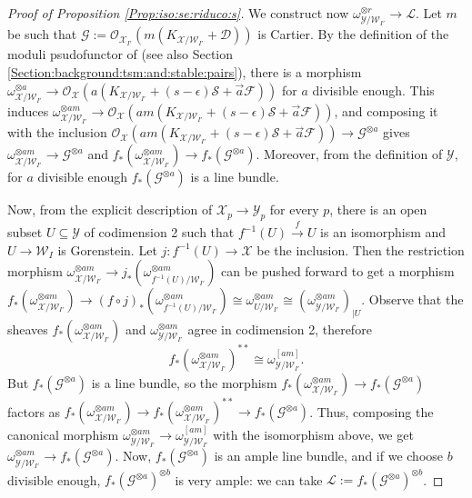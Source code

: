 \documentclass[11pt]{amsart}
\newcommand{\cE}{\mathcal{W}}
\newcommand{\sD}{\mathscr{D}}
\newcommand{\sF}{\mathscr{F}}
\newcommand{\sG}{\mathscr{G}}
\newcommand{\sL}{\mathscr{L}}
\newcommand{\sS}{\mathscr{S}}
\newcommand{\sX}{\mathscr{X}}
\newcommand{\cO}{\mathcal{O}}
\newcommand{\sY}{\mathscr{Y}}
\theoremstyle{definition}
\begin{document}
\begin{proof}[Proof of Proposition \ref{Prop:iso:se:riduco:s}]
 We construct now $\omega_{\sY/\cE_{I'}}^{\otimes r} \to \sL$. Let $m$ be such that $\sG:=\cO_{\sX_{I'}}(m(K_{\sX/\cE_{I'}}+\sD))$ is Cartier. By the definition of the moduli psudofunctor of
 \cite{KP} (see also Section \ref{Section:background:tsm:and:stable:pairs}), there is a morphism
 $\omega_{\sX/\cE_{I'}}^{\otimes a} \to \cO_{\sX}(a(K_{\sX/\cE_{I'}}+(s-\epsilon)\sS+\vec{a}\sF))$ for $a$ divisible enough. This induces $\omega_{\sX/\cE_{I'}}^{\otimes am} \to \cO_{\sX}(am(K_{\sX/\cE_{I'}}+(s-\epsilon)\sS+\vec{a}\sF))$, and composing it with the inclusion $\cO_{\sX}(am(K_{\sX/\cE_{I'}}+(s-\epsilon)\sS+\vec{a}\sF)) \to \sG^{\otimes a}$ gives $\omega_{\sX/\cE_{I'}}^{\otimes am}\to \sG^{\otimes a}$ and
 $f_*(\omega_{\sX/\cE_{I'}}^{\otimes am})\to f_*(\sG^{\otimes a})$. Moreover, from the definition of $\sY$, for $a$ divisible enough $f_*(\sG^{\otimes a})$ is a line bundle.
 
  Now, from the explicit description of $\sX_p
 \to \sY_p$ for every $p$, there is an open subset $U \subseteq \sY$ of codimension 2 such that $f^{-1}(U) \xrightarrow{f} U$ is an isomorphism and $U \to \cE_I$ is Gorenstein. Let $j:f^{-1}(U) \to \sX$ be the inclusion. Then the restriction morphism $\omega_{\sX/\cE_{I'}}^{\otimes am} \to j_*(\omega_{f^{-1}(U)/\cE_{I'}}^{\otimes am})$ can be pushed forward to get a morphism $f_*(\omega_{\sX/\cE_{I'}}^{\otimes am}) \to (f\circ j)_*(\omega_{f^{-1}(U)/\cE_{I'}}^{\otimes am}) \cong \omega_{U/\cE_{I'}}^{\otimes am} \cong (\omega_{\sY/\cE_{I'}}^{\otimes am})_{|U}$. Observe that the sheaves $f_*(\omega_{\sX/\cE_{I'}}^{\otimes am})$ and $\omega_{\sY/\cE_{I'}}^{\otimes am}$ agree in codimension 2, therefore
$$f_*(\omega_{\sX/\cE_{I'}}^{\otimes am})^{**} \cong \omega_{\sY/\cE_{I'}}^{[am]}.$$But $f_*(\sG^{\otimes a})$ is a line bundle, so the morphism $f_*(\omega_{\sX/\cE_{I'}}^{\otimes am})\to f_*(\sG^{\otimes a})$ factors as
 $f_*(\omega_{\sX/\cE_{I'}}^{\otimes am})\to
 f_*(\omega_{\sX/\cE_{I'}}^{\otimes am})^{**} \to f_*(\sG^{\otimes a})$. Thus, composing the canonical morphism $\omega_{\sY/\cE_{I'}}^{\otimes am} \to \omega_{\sY/\cE_{I'}}^{[am]}$ with the isomorphism above, we get
$\omega_{\sY/\cE_{I'}}^{\otimes am} \to f_*(\sG^{\otimes a})$.
 Now, $f_*(\sG^{\otimes a})$ is an ample line bundle, and if we choose $b$ divisible enough, $f_*(\sG^{\otimes a})^{\otimes b}$ is
 very ample: we can take $\sL:=f_*(\sG^{\otimes a})^{\otimes b}$. 
 

\end{proof}
\end{document}
